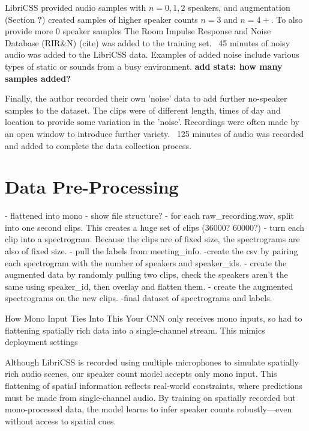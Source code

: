 LibriCSS provided audio samples with $n = 0, 1, 2$ speakers, and augmentation (Section \textbf{?}) created samples of higher speaker counts $n = 3$ and $n = 4+$. To also provide more 0 speaker samples The Room Impulse Response and Noise Database (RIR&N) (cite) was added to the training set. ~45 minutes of noisy audio was added to the LibriCSS data. Examples of added noise include various types of static or sounds from a busy environment. \textbf{add stats: how many samples added?}

Finally, the author recorded their own 'noise' data to add further no-speaker samples to the dataset. The clips were of different length, times of day and location to provide some variation in the 'noise'. Recordings were often made by an open window to introduce further variety. ~125 minutes of audio was recorded and added to complete the data collection process.


\section{Data Pre-Processing}





- flattened into mono
- show file structure?
- for each raw_recording.wav, split into one second clips. This creates a huge set of clips (36000? 60000?)
- turn each clip into a spectrogram. Because the clips are of fixed size, the spectrograms are also of fixed size.
- pull the labels from meeting_info.
-create the csv by pairing each spectrogram with the number of speakers and speaker_ids.
- create the augmented data by randomly pulling two clips, check the speakers aren't the same using speaker_id, then overlay and flatten them.
- create the augmented spectrograms on the new clips.
-final dataset of spectrograms and labels.



How Mono Input Ties Into This
Your CNN only receives mono inputs, so had to flattening spatially rich data into a single-channel stream. This mimics deployment settings

Although LibriCSS is recorded using multiple microphones to simulate spatially rich audio scenes, our speaker count model accepts only mono input. This flattening of spatial information reflects real-world constraints, where predictions must be made from single-channel audio. By training on spatially recorded but mono-processed data, the model learns to infer speaker counts robustly—even without access to spatial cues.



